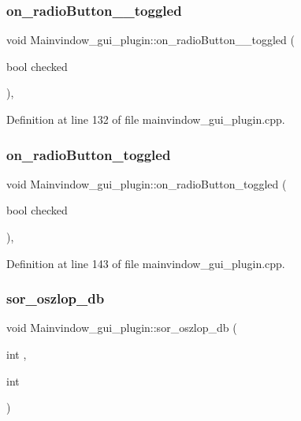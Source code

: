 \subsubsection{\texorpdfstring{on\+\_\+radio\+Button\+\_\+\_\+toggled}{on\_radioButton\_2\_toggled}}
{\footnotesize\ttfamily void Mainvindow\+\_\+gui\+\_\+plugin\+::on\+\_\+radio\+Button\+\_\+\_\+toggled (\begin{DoxyParamCaption}\item[{bool}]{checked }\end{DoxyParamCaption})\hspace{0.3cm}{\ttfamily [private]}, {\ttfamily [slot]}}



Definition at line 132 of file mainvindow\+\_\+gui\+\_\+plugin.\+cpp.

\mbox{\label{classMainvindow__gui__plugin_a7e06d5ee7068a413da91bb8125ad4a7d}} 
\subsubsection{\texorpdfstring{on\+\_\+radio\+Button\+\_\+toggled}{on\_radioButton\_toggled}}
{\footnotesize\ttfamily void Mainvindow\+\_\+gui\+\_\+plugin\+::on\+\_\+radio\+Button\+\_\+toggled (\begin{DoxyParamCaption}\item[{bool}]{checked }\end{DoxyParamCaption})\hspace{0.3cm}{\ttfamily [private]}, {\ttfamily [slot]}}



Definition at line 143 of file mainvindow\+\_\+gui\+\_\+plugin.\+cpp.

\mbox{\label{classMainvindow__gui__plugin_adb6c0d468163f8192f2138b15a6c43e9}} 
\subsubsection{\texorpdfstring{sor\+\_\+oszlop\+\_\+db}{sor\_oszlop\_db}}
{\footnotesize\ttfamily void Mainvindow\+\_\+gui\+\_\+plugin\+::sor\+\_\+oszlop\+\_\+db (\begin{DoxyParamCaption}\item[{int}]{,  }\item[{int}]{ }\end{DoxyParamCaption})\hspace{0.3cm}{\ttfamily [signal]}}

